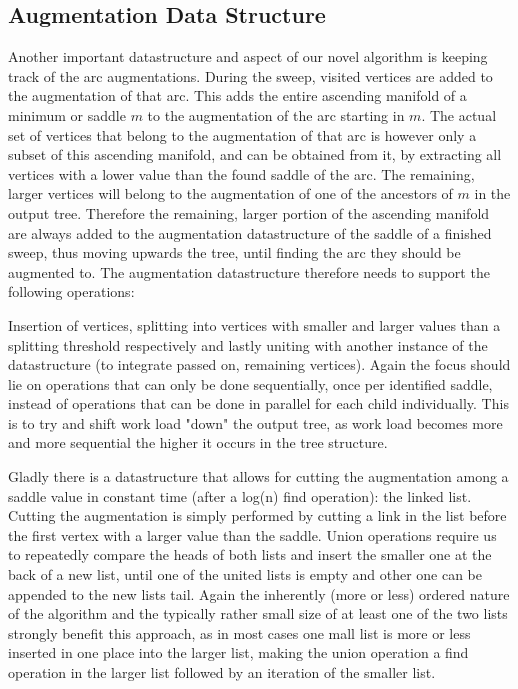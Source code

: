 \documentclass{scrartcl}
\begin{document}
\subsection{Augmentation Data Structure}
Another important datastructure and aspect of our novel algorithm is keeping track of the arc augmentations. During the sweep, visited vertices are added to the augmentation of that arc. This adds the entire ascending manifold of a minimum or saddle \(m\) to the augmentation of the arc starting in \(m\). The actual set of vertices that belong to the augmentation of that arc is however only a subset of this ascending manifold, and can be obtained from it, by extracting all vertices with a lower value than the found saddle of the arc. The remaining, larger vertices will belong to the augmentation of one of the ancestors of \(m\) in the output tree. Therefore the remaining, larger portion of the ascending manifold are always added to the augmentation datastructure of the saddle of a finished sweep, thus moving upwards the tree, until finding the arc they should be augmented to. The augmentation datastructure therefore needs to support the following operations:

Insertion of vertices, splitting into vertices with smaller and larger values than a splitting threshold respectively and lastly uniting with another instance of the datastructure (to integrate passed on, remaining vertices). Again the focus should lie on operations that can only be done sequentially, once per identified saddle, instead of operations that can be done in parallel for each child individually. This is to try and shift work load "down" the output tree, as work load becomes more and more sequential the higher it occurs in the tree structure.

Gladly there is a datastructure that allows for cutting the augmentation among a saddle value in constant time (after a log(n) find operation): the linked list. Cutting the augmentation is simply performed by cutting a link in the list before the first vertex with a larger value than the saddle. Union operations require us to repeatedly compare the heads of both lists and insert the smaller one at the back of a new list, until one of the united lists is empty and other one can be appended to the new lists tail. Again the inherently (more or less) ordered nature of the algorithm and the typically rather small size of at least one of the two lists strongly benefit this approach, as in most cases one mall list is more or less inserted in one place into the larger list, making the union operation a find operation in the larger list followed by an iteration of the smaller list.
\end{document}
